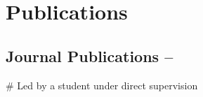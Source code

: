 \section{Publications}

\subsection{Journal Publications -- \href{https://ui.adsabs.harvard.edu/search/filter_database_fq_database=OR&filter_database_fq_database=database\%3A\%22astronomy\%22&fq=\%7B!type\%3Daqp\%20v\%3D\%24fq_database\%7D&fq_database=(database\%3A\%22astronomy\%22)&q=\%3Dauthor\%3A(\%22Kim\%2C\%20Jeong-Gyu\%22)&sort=date\%20desc\%2C\%20bibcode\%20desc}{\color{dodgerblue}{ADS
Search}}}


\# Led by a student under direct supervision

